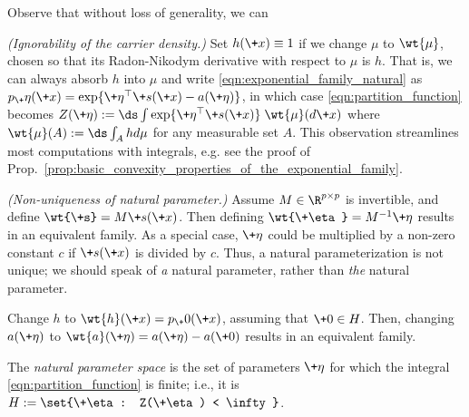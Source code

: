 \documentclass{article} %
\newcommand{\obs}{\+x}
\newcommand{\normalizerFunction}{Z}
\newcommand{\logNormalizerFunction}{a}
\newcommand{\sufficientStatsFunction}{\+s}
\newcommand{\carrierDensity}{h}
\newcommand{\naturalParam}{\+\eta}
\newcommand{\naturalParamSpace}{H}
\begin{document}
\begin{remark}
Observe \cite{chua2019stats} that without loss of generality, we can 
\begin{alphabate} 
\item \label{item:ignorabiity_of_carrier_density} \textit{(Ignorability of the carrier density.)} Set $\carrierDensity(\obs) \equiv 1$ if we change $\mu$ to $\wt{\mu}$, chosen so that its Radon-Nikodym derivative with respect to $\mu$ is $\carrierDensity$. That is, we can always absorb $\carrierDensity$ into $\mu$ and write \eqref{eqn:exponential_family_natural} as  $p_\naturalParam(\obs) = \exp \{ \naturalParam^\top \sufficientStatsFunction(\obs) - \logNormalizerFunction(\naturalParam)\}$, in which case \eqref{eqn:partition_function} becomes $\normalizerFunction(\naturalParam) := \ds\int  \exp \{ \naturalParam^\top \sufficientStatsFunction(\obs)  \} \; \wt{\mu} (d\obs) $ where $\wt{\mu}(A) := \ds\int_A \carrierDensity d\mu$ for any measurable set $A$.   This observation streamlines most computations with integrals, e.g. see the proof of Prop.~\ref{prop:basic_convexity_properties_of_the_exponential_family}. 
\item \label{item:nonuniqueness_of_natural_parameter} \textit{(Non-uniqueness of natural parameter.)} Assume $M \in \R^{p \times p}$ is invertible, and define $\wt{\sufficientStatsFunction} = M \sufficientStatsFunction(\obs)$. Then defining $\wt{\naturalParam} = M^{-1} \naturalParam$ results in an equivalent family.  As a special case, $\naturalParam$ could be multiplied by a non-zero constant $c$ if $\sufficientStatsFunction(\obs)$ is divided by $c$.  Thus, a natural parameterization is not unique; we should speak of \textit{a} natural parameter,  rather than \textit{the} natural parameter.
\item Change $\carrierDensity$ to $\wt{\carrierDensity}(\obs) = p_\+0(\obs)$, assuming that $\+0 \in \naturalParamSpace$.  Then, changing $\logNormalizerFunction(\naturalParam)$ to $\wt{\logNormalizerFunction}(\naturalParam) = \logNormalizerFunction(\naturalParam) - \logNormalizerFunction(\+0)$ results in an equivalent family. 
\end{alphabate}
\label{rk:alternate_constructions_for_the_exponential_family}
\end{remark}


\begin{definition}
The \textit{natural parameter space} is the set of parameters $\naturalParam$ for which the integral \eqref{eqn:partition_function} is finite; i.e., it is $\naturalParamSpace:=\set{\naturalParam : \normalizerFunction(\naturalParam) < \infty}$.
\end{definition}
\end{document}
